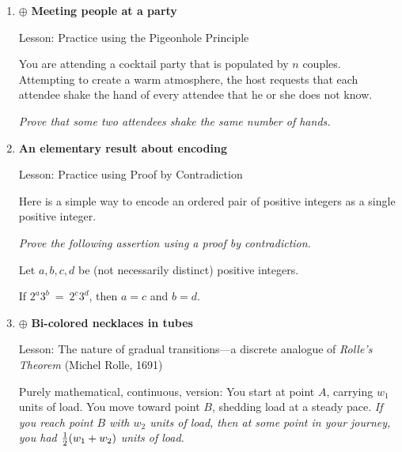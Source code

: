 \begin{enumerate}
\begin{enumerate}
{The basis case of the induction is for $k=1$
*********}
  \end{enumerate}


\item
$\oplus$
{\bf Meeting people at a party}

{\sc Lesson:} Practice using the Pigeonhole Principle

\smallskip

You are attending a cocktail party that is populated by $n$ couples.  Attempting to create a warm atmosphere, the host requests that each attendee shake the hand of every attendee that he or she does not know.

\smallskip

{\em Prove that some two attendees shake the same number of hands.}

\item
{\bf An elementary result about encoding}

{\sc Lesson:} Practice using Proof by Contradiction

\smallskip

Here is a simple way to encode an ordered pair of positive integers as a single positive integer.

\smallskip

{\em Prove the following assertion using a proof by contradiction.}

\begin{prop}
Let $a, b, c, d$ be (not necessarily distinct) positive integers.

If $2^a 3^b \ = \ 2^c 3^d$, then $a=c$ and $b=d$.
\end{prop}


\item
$\oplus$
{\bf Bi-colored necklaces in tubes}

 
{\sc Lesson:} The nature of gradual transitions---a discrete analogue of {\em Rolle's Theorem} {\small (Michel Rolle, 1691)}

\smallskip

{\small\sf Purely mathematical, continuous, version}:
You start at point $A$, carrying $w_1$ units of load. You move toward point $B$, shedding load at a steady pace.  {\em If you reach point $B$ with $w_2$ units of load, then at some point in your journey, you had ${1 \over 2} (w_1 + w_2)$ units of load.}

\smallskip


\end{enumerate}
